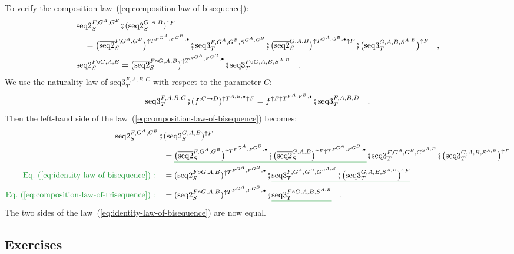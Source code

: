 To verify the composition law~(\ref{eq:composition-law-of-bisequence}):
\begin{align*}
 & \text{seq2}_{S}^{F,G^{A},G^{B}}\bef(\text{seq2}_{S}^{G,A,B})^{\uparrow F}\\
 & \quad=\big(\overline{\text{seq2}}_{S}^{F,G^{A},G^{B}}\big)^{\uparrow T^{F^{G^{A}},F^{G^{B}},\bullet}}\bef\text{seq3}_{T}^{F,G^{A},G^{B},S^{G^{A},G^{B}}}\bef\big(\overline{\text{seq2}}_{S}^{G,A,B}\big)^{\uparrow T^{G^{A},G^{B},\bullet}\uparrow F}\bef\big(\text{seq3}_{T}^{G,A,B,S^{A,B}}\big)^{\uparrow F}\quad,\\
 & \text{seq2}_{S}^{F\circ G,A,B}=\big(\overline{\text{seq2}}_{S}^{F\circ G,A,B}\big)^{\uparrow T^{F^{G^{A}},F^{G^{B}},\bullet}}\bef\text{seq3}_{T}^{F\circ G,A,B,S^{A,B}}\quad.
\end{align*}
We use the naturality law of $\text{seq3}_{T}^{F,A,B,C}$ with respect
to the parameter $C$:
\[
\text{seq3}_{T}^{F,A,B,C}\bef(f^{:C\rightarrow D})^{\uparrow T^{A,B,\bullet}\uparrow F}=f^{\uparrow F\uparrow T^{F^{A},F^{B},\bullet}}\bef\text{seq3}_{T}^{F,A,B,D}\quad.
\]
Then the left-hand side of the law~(\ref{eq:composition-law-of-bisequence})
becomes:
\begin{align*}
\text{seq2}_{S}^{F,G^{A},G^{B}}\bef & (\text{seq2}_{S}^{G,A,B})^{\uparrow F}\\
 & =\gunderline{\big(\overline{\text{seq2}}_{S}^{F,G^{A},G^{B}}\big)^{\uparrow T^{F^{G^{A}},F^{G^{B}},\bullet}}\bef\big(\overline{\text{seq2}}_{S}^{G,A,B}\big)^{\uparrow F\uparrow T^{F^{G^{A}},F^{G^{B}},\bullet}}}\bef\text{seq3}_{T}^{F,G^{A},G^{B},G^{S^{A,B}}}\bef\big(\text{seq3}_{T}^{G,A,B,S^{A,B}}\big)^{\uparrow F}\\
{\color{greenunder}\text{Eq.~(\ref{eq:identity-law-of-bisequence})}:}\quad & =(\text{seq2}_{S}^{F\circ G,A,B})^{\uparrow T^{F^{G^{A}},F^{G^{B}},\bullet}}\bef\gunderline{\text{seq3}_{T}^{F,G^{A},G^{B},G^{S^{A,B}}}\bef\big(\text{seq3}_{T}^{G,A,B,S^{A,B}}\big)^{\uparrow F}}\\
{\color{greenunder}\text{Eq.~(\ref{eq:composition-law-of-trisequence})}:}\quad & =(\text{seq2}_{S}^{F\circ G,A,B})^{\uparrow T^{F^{G^{A}},F^{G^{B}},\bullet}}\bef\gunderline{\text{seq3}_{T}^{F\circ G,A,B,S^{A,B}}}\quad.
\end{align*}
The two sides of the law~(\ref{eq:identity-law-of-bisequence}) are
now equal.

\subsection{Exercises}

